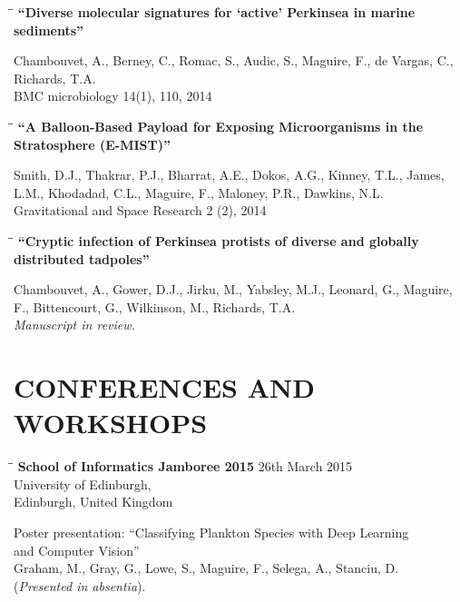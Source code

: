 \documentclass{res}
\begin{document}
\begin{resume}
\vspace{-0.2in}
\begin{tabbing}
   \hspace{2.3in}\= \hspace{2.6in}\= \kill
   {\bf ``Diverse molecular signatures for `active' Perkinsea in marine sediments''} 
   \end{tabbing}\vspace{-20pt}
     Chambouvet, A., Berney, C., Romac, S., Audic, S., Maguire, F., de Vargas, C., Richards, T.A.\\
     BMC microbiology 14(1), 110, 2014\\

\vspace{-0.2in}
\begin{tabbing}
   \hspace{2.3in}\= \hspace{2.6in}\= \kill
   {\bf ``A Balloon-Based Payload for Exposing Microorganisms in the Stratosphere (E-MIST)''}
   \end{tabbing}\vspace{-20pt}
Smith, D.J., Thakrar, P.J., Bharrat, A.E., Dokos, A.G., Kinney, T.L., James, L.M., Khodadad, C.L., Maguire, F., Maloney, P.R., Dawkins, N.L.\\
Gravitational and Space Research 2 (2), 2014\\

\vspace{-0.1in}
\begin{tabbing}
   \hspace{2.3in}\= \hspace{2.6in}\= \kill
   {\bf ``Cryptic infection of Perkinsea protists of diverse and globally distributed tadpoles''}
   \end{tabbing}\vspace{-20pt}
   Chambouvet, A., Gower, D.J., Jirku, M., Yabsley, M.J., Leonard, G., Maguire, F., Bittencourt, G., Wilkinson, M., Richards, T.A.\\
\emph{Manuscript in review.}



\section{CONFERENCES AND WORKSHOPS}
  \vspace{-0.05in}
\begin{tabbing}
\hspace{2in}\= \hspace{2.6in}\= \kill
{\bf School of Informatics Jamboree 2015} \> \> 26th March 2015\\
\> \>University of Edinburgh,  \\
\> \> Edinburgh, United Kingdom\\
\end{tabbing}\vspace{-40pt}
Poster presentation: ``Classifying Plankton Species with Deep Learning \\
and Computer Vision''\\
Graham, M., Gray, G., Lowe, S., Maguire, F., Selega, A., Stanciu, D. \\
(\emph{Presented in absentia}).



\end{resume}
\end{document}
